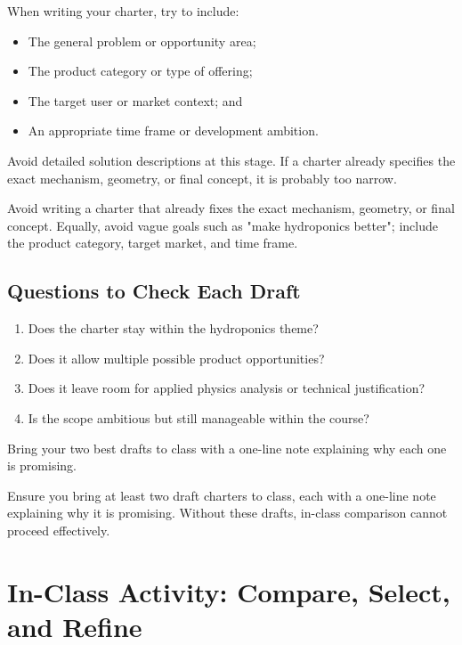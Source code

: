 When writing your charter, try to include:

\begin{itemize}
    \item The general problem or opportunity area;
    \item The product category or type of offering;
    \item The target user or market context; and
    \item An appropriate time frame or development ambition.
\end{itemize}

Avoid detailed solution descriptions at this stage. If a charter already specifies the exact mechanism, geometry, or final concept, it is probably too narrow.

\begin{tcolorbox}[title=Common Mistakes]
Avoid writing a charter that already fixes the exact mechanism, geometry, or final concept. Equally, avoid vague goals such as "make hydroponics better"; include the product category, target market, and time frame.
\end{tcolorbox}

\subsection{Questions to Check Each Draft}
\begin{enumerate}
    \item Does the charter stay within the hydroponics theme?
    \item Does it allow multiple possible product opportunities?
    \item Does it leave room for applied physics analysis or technical justification?
    \item Is the scope ambitious but still manageable within the course?
\end{enumerate}

Bring your two best drafts to class with a one-line note explaining why each one is promising.

\begin{tcolorbox}[title=Checkpoint]
Ensure you bring at least two draft charters to class, each with a one-line note explaining why it is promising. Without these drafts, in-class comparison cannot proceed effectively.
\end{tcolorbox}

\section{In-Class Activity: Compare, Select, and Refine}

